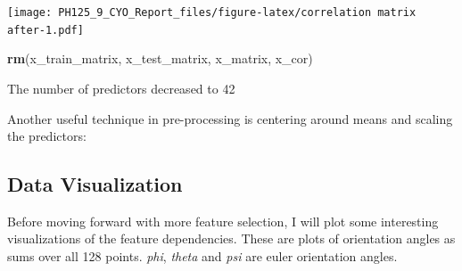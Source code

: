 \documentclass[]{article}
\newenvironment{Shaded}{\begin{snugshade}}{\end{snugshade}}
\newcommand{\CommentTok}[1]{\textcolor[rgb]{0.56,0.35,0.01}{\textit{#1}}}
\newcommand{\DataTypeTok}[1]{\textcolor[rgb]{0.13,0.29,0.53}{#1}}
\newcommand{\DecValTok}[1]{\textcolor[rgb]{0.00,0.00,0.81}{#1}}
\newcommand{\KeywordTok}[1]{\textcolor[rgb]{0.13,0.29,0.53}{\textbf{#1}}}
\newcommand{\NormalTok}[1]{#1}
\newcommand{\OperatorTok}[1]{\textcolor[rgb]{0.81,0.36,0.00}{\textbf{#1}}}
\newcommand{\StringTok}[1]{\textcolor[rgb]{0.31,0.60,0.02}{#1}}
\begin{document}
\texttt{[image: PH125\_9\_CYO\_Report\_files/figure-latex/correlation matrix after-1.pdf]}

\begin{Shaded}
\begin{Highlighting}[]
\KeywordTok{rm}\NormalTok{(x_train_matrix, x_test_matrix, x_matrix, x_cor)}
\end{Highlighting}
\end{Shaded}

The number of predictors decreased to 42

Another useful technique in pre-processing is centering around means and
scaling the predictors:

\begin{Shaded}
\end{Shaded}

\hypertarget{data-visualization}{%
\subsection{Data Visualization}\label{data-visualization}}

Before moving forward with more feature selection, I will plot some
interesting visualizations of the feature dependencies. These are plots
of orientation angles as sums over all 128 points. \emph{phi},
\emph{theta} and \emph{psi} are euler orientation angles.

\begin{Shaded}
\end{Shaded}
\end{document}
